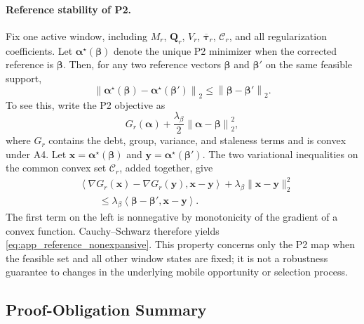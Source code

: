 \documentclass[letterpaper,journal]{IEEEtran}
\begin{document}
\paragraph{Reference stability of P2.}
Fix one active window, including $M_r$, $\mathbf Q_r$, $V_r$,
$\overline{\boldsymbol\tau}_r$, $\mathcal C_r$, and all regularization
coefficients.  Let $\boldsymbol\alpha^\star(\boldsymbol\beta)$ denote the
unique P2 minimizer when the corrected reference is
$\boldsymbol\beta$.  Then, for any two reference vectors
$\boldsymbol\beta$ and $\boldsymbol\beta'$ on the same feasible support,
\begin{equation}
 \left\|
 \boldsymbol\alpha^\star(\boldsymbol\beta)
 -
 \boldsymbol\alpha^\star(\boldsymbol\beta')
 \right\|_2
 \le
 \left\|
 \boldsymbol\beta-\boldsymbol\beta'
 \right\|_2.
 \label{eq:app_reference_nonexpansive}
\end{equation}
To see this, write the P2 objective as
\begin{equation}
 G_r(\boldsymbol\alpha)
 +\frac{\lambda_\beta}{2}
 \left\|
 \boldsymbol\alpha-\boldsymbol\beta
 \right\|_2^2,
 \label{eq:app_p2_split}
\end{equation}
where $G_r$ contains the debt, group, variance, and staleness terms and is
convex under A4.  Let
$\mathbf x=\boldsymbol\alpha^\star(\boldsymbol\beta)$ and
$\mathbf y=\boldsymbol\alpha^\star(\boldsymbol\beta')$.  The two variational
inequalities on the common convex set $\mathcal C_r$, added together, give
\begin{align}
 &\left\langle
 \nabla G_r(\mathbf x)-\nabla G_r(\mathbf y),
 \mathbf x-\mathbf y
 \right\rangle
 +\lambda_\beta\|\mathbf x-\mathbf y\|_2^2
 \nonumber\\
 &\qquad\le
 \lambda_\beta
 \left\langle
 \boldsymbol\beta-\boldsymbol\beta',
 \mathbf x-\mathbf y
 \right\rangle.
 \label{eq:app_reference_vi}
\end{align}
The first term on the left is nonnegative by monotonicity of the gradient of a
convex function.  Cauchy--Schwarz therefore yields
\eqref{eq:app_reference_nonexpansive}.  This property concerns only the P2 map
when the feasible set and all other window states are fixed; it is not a
robustness guarantee to changes in the underlying mobile opportunity or
selection process.

\subsection{Proof-Obligation Summary}
\label{app:proof_summary}
\end{document}
